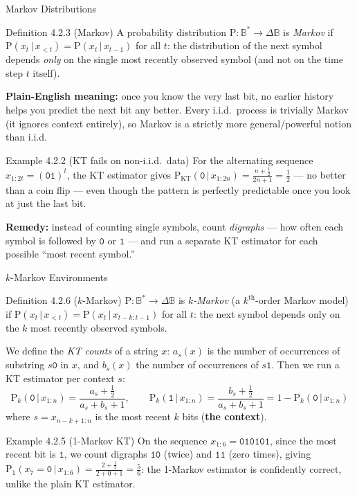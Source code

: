\documentclass[aspectratio=169,10pt]{beamer}
\newcommand{\PKT}{\mathrm{P}_{\mathrm{KT}}}
\newcommand{\BB}{\mathbb{B}}
\begin{document}
\begin{frame}{Markov Distributions}
\begin{block}{Definition 4.2.3 (Markov)}
A probability distribution $\mathrm{P}:\BB^*\to\Delta\BB$ is \emph{Markov} if
$\mathrm{P}(x_t\,|\,x_{<t}) = \mathrm{P}(x_t\,|\,x_{t-1})$ for all $t$: the distribution of
the next symbol depends \emph{only} on the single most recently observed symbol (and not on
the time step $t$ itself).
\end{block}
\textbf{Plain-English meaning:} once you know the very last bit, no earlier history helps
you predict the next bit any better. Every i.i.d.\ process is trivially Markov (it ignores
context entirely), so Markov is a strictly more general/powerful notion than i.i.d.

\begin{exampleblock}{Example 4.2.2 (KT fails on non-i.i.d.\ data)}
For the alternating sequence $x_{1:2t}=(\mathtt{01})^t$, the KT estimator gives
$\PKT(\mathtt 0\,|\,x_{1:2n})=\frac{n+\frac12}{2n+1}=\frac12$ — no better than a coin flip
— even though the pattern is perfectly predictable once you look at just the last bit.
\end{exampleblock}

\textbf{Remedy:} instead of counting single symbols, count \emph{digraphs} — how often each
symbol is followed by $\mathtt 0$ or $\mathtt 1$ — and run a separate KT estimator for each
possible ``most recent symbol.''
\end{frame}

\begin{frame}{$k$-Markov Environments}
\begin{block}{Definition 4.2.6 ($k$-Markov)}
$\mathrm{P}:\BB^*\to\Delta\BB$ is \emph{$k$-Markov} (a $k^{\mathrm{th}}$-order Markov
model) if $\mathrm{P}(x_t\,|\,x_{<t}) = \mathrm{P}(x_t\,|\,x_{t-k:t-1})$ for all $t$: the
next symbol depends only on the $k$ most recently observed symbols.
\end{block}
We define the \emph{KT counts} of a string $x$: $a_s(x)$ is the number of occurrences of
substring $s\mathtt 0$ in $x$, and $b_s(x)$ the number of occurrences of $s\mathtt 1$. Then
we run a KT estimator per context $s$:
$$
\mathrm{P}_k(\mathtt 0\,|\,x_{1:n}) = \frac{a_s+\tfrac12}{a_s+b_s+1}, \qquad
\mathrm{P}_k(\mathtt 1\,|\,x_{1:n}) = \frac{b_s+\tfrac12}{a_s+b_s+1} = 1-\mathrm{P}_k(\mathtt 0\,|\,x_{1:n})
$$
where $s = x_{n-k+1:n}$ is the most recent $k$ bits (\textbf{the context}).

\begin{exampleblock}{Example 4.2.5 (1-Markov KT)}
On the sequence $x_{1:6}=\mathtt{010101}$, since the most recent bit is $\mathtt 1$, we
count digraphs $\mathtt{10}$ (twice) and $\mathtt{11}$ (zero times), giving
$\mathrm{P}_1(x_7=\mathtt 0\,|\,x_{1:6})=\frac{2+\frac12}{2+0+1}=\frac56$: the 1-Markov
estimator is confidently correct, unlike the plain KT estimator.
\end{exampleblock}
\end{frame}
\end{document}
